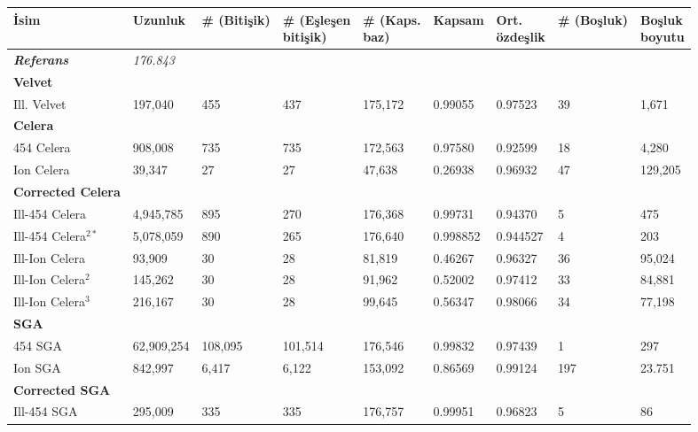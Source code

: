 \begin{table}[htb]
\begin{center}
{\footnotesize
\begin{tabular}{l|l|l|l|l|l|l|l|l|}
\hline
         İsim & Uzunluk & \# (Bitişik) & \thead{\# (Eşleşen \\ bitişik)} & \thead{\# (Kaps.\\ baz)} & Kapsam & \thead{Ort. \\özdeşlik} & \# (Boşluk) & \thead{Boşluk \\ boyutu} \\
\hline
	 \textbf{\textit{Referans}} & \textit{176.843} & & & & & & & \\
\hline	 
	 \textbf{Velvet} & & & & & & & & \\
         Ill. Velvet & 197,040 & 455 & 437 & 175,172 & 0.99055 & 0.97523 & 39 & 1,671 \\
         \textbf{Celera} & & & & & & & & \\       
         454 Celera & 908,008 & 735 & 735 & 172,563 & 0.97580 & 0.92599 & 18 & 4,280 \\
         Ion Celera & 39,347 & 27 & 27 & 47,638 & 0.26938 & 0.96932 & 47 & 129,205 \\
         \hline   
         \textbf{Corrected Celera} & & & & & & & & \\
         Ill-454 Celera & 4,945,785 & 895 & 270 & 176,368 & 0.99731 & 0.94370 & 5 & 475 \\
         Ill-454 Celera$^{2*}$ & 5,078,059 & 890 & 265 & 176,640 & 0.998852 & 0.944527 & 4 & 203 \\
         Ill-Ion Celera & 93,909 & 30 & 28 & 81,819 & 0.46267 & 0.96327 & 36 & 95,024 \\
         Ill-Ion Celera$^2$ & 145,262 & 30 & 28 & 91,962 & 0.52002 & 0.97412 & 33 & 84,881 \\
         Ill-Ion Celera$^3$ & 216,167 & 30 & 28 & 99,645 & 0.56347 & 0.98066 & 34 & 77,198 \\
         \textbf{SGA} & & & & & & & & \\
         454 SGA & 62,909,254 & 108,095 & 101,514 & 176,546 & 0.99832 & 0.97439 & 1 & 297 \\
         Ion SGA & 842,997 & 6,417 & 6,122 & 153,092 & 0.86569 & 0.99124 & 197 & 23.751 \\	
         \hline
         \textbf{Corrected SGA} & & & & & & & & \\
         Ill-454 SGA & 295,009 & 335 & 335 & 176,757 & 0.99951 & 0.96823 & 5 & 86 \\

\end{tabular}}
\end{center}
\end{table}
